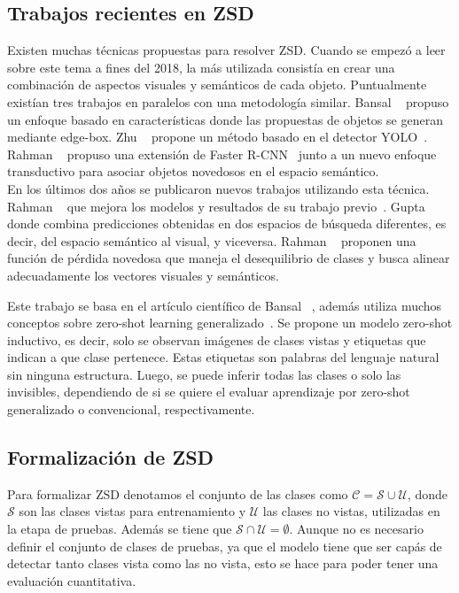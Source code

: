 \subsection{Trabajos recientes en ZSD} \label{ssec:trabajosrecientesenzsd}

Existen muchas técnicas propuestas para resolver ZSD. Cuando se empezó a leer sobre este tema a fines del 2018, la más utilizada consistía en crear una combinación de aspectos visuales y semánticos de cada objeto. Puntualmente existían tres trabajos en paralelos con una metodología similar. Bansal \etal~\cite{bansal2018zero} propuso un enfoque basado en características donde las propuestas de objetos se generan mediante edge-box. Zhu \etal~\cite{zhu2018zero} propone un método basado en el detector YOLO~\cite{redmon2016you}. Rahman \etal~\cite{rahman2018zero} propuso una extensión de Faster R-CNN~\cite{ren2015faster} junto a un nuevo enfoque transductivo para asociar objetos novedosos en el espacio semántico.\\

En los últimos dos años se publicaron nuevos trabajos utilizando esta técnica. Rahman \etal~\cite{rahman2020zero} que mejora los modelos y resultados de su trabajo previo~\cite{rahman2018zero}. Gupta \etal~\cite{gupta2020multi} donde combina predicciones obtenidas en dos espacios de búsqueda diferentes, es decir, del espacio semántico al visual, y viceversa. Rahman \etal~\cite{rahman2020improved} proponen  una función de pérdida novedosa que maneja el desequilibrio de clases y busca alinear adecuadamente los vectores visuales y semánticos.

Este trabajo se basa en el artículo científico de Bansal \etal ~\cite{bansal2018zero}, además utiliza muchos conceptos sobre zero-shot learning generalizado~\cite{zero-shot-generalizado}. Se propone un modelo zero-shot  inductivo, es decir, solo se observan imágenes de clases vistas y etiquetas que indican a que clase pertenece. Estas etiquetas son palabras del lenguaje natural sin ninguna estructura. Luego, se puede inferir todas las clases o solo las invisibles, dependiendo de si se quiere el evaluar aprendizaje por zero-shot  generalizado o convencional, respectivamente.\\ 

\subsection{Formalización de ZSD} \label{ssec:formalizaciondezsd}
Para formalizar ZSD denotamos el conjunto de las clases como $\mathcal{C} = \mathcal{S} \cup \mathcal{U}$, donde $\mathcal{S}$ son las clases vistas para entrenamiento y $\mathcal{U}$ las clases no vistas, utilizadas en la etapa de pruebas. Además se tiene que $\mathcal{S} \cap \mathcal{U} = \emptyset$. Aunque no es necesario definir el conjunto de clases de pruebas, ya que el modelo tiene que ser capás de detectar tanto clases vista como las no vista, esto se hace para poder tener una evaluación cuantitativa.

